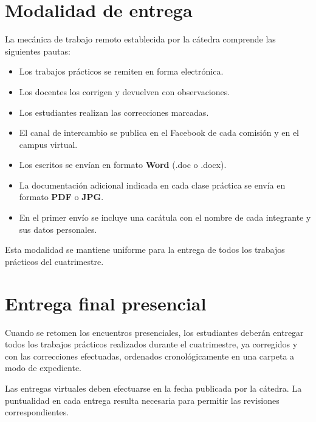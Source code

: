 \documentclass[12pt,oneside]{book}
\begin{document}
\section{Modalidad de entrega}

La mecánica de trabajo remoto establecida por la cátedra comprende las siguientes pautas:

\begin{itemize}
    \item Los trabajos prácticos se remiten en forma electrónica.
    \item Los docentes los corrigen y devuelven con observaciones.
    \item Los estudiantes realizan las correcciones marcadas.
    \item El canal de intercambio se publica en el Facebook de cada comisión y en el campus virtual.
    \item Los escritos se envían en formato \textbf{Word} (.doc o .docx).
    \item La documentación adicional indicada en cada clase práctica se envía en formato \textbf{PDF} o \textbf{JPG}.
    \item En el primer envío se incluye una carátula con el nombre de cada integrante y sus datos personales.
\end{itemize}

Esta modalidad se mantiene uniforme para la entrega de todos los trabajos prácticos del cuatrimestre.

\section{Entrega final presencial}

Cuando se retomen los encuentros presenciales, los estudiantes deberán entregar todos los trabajos prácticos realizados durante el cuatrimestre, ya corregidos y con las correcciones efectuadas, ordenados cronológicamente en una carpeta a modo de expediente.

\begin{important}
Las entregas virtuales deben efectuarse en la fecha publicada por la cátedra. La puntualidad en cada entrega resulta necesaria para permitir las revisiones correspondientes.
\end{important}

\end{document}
